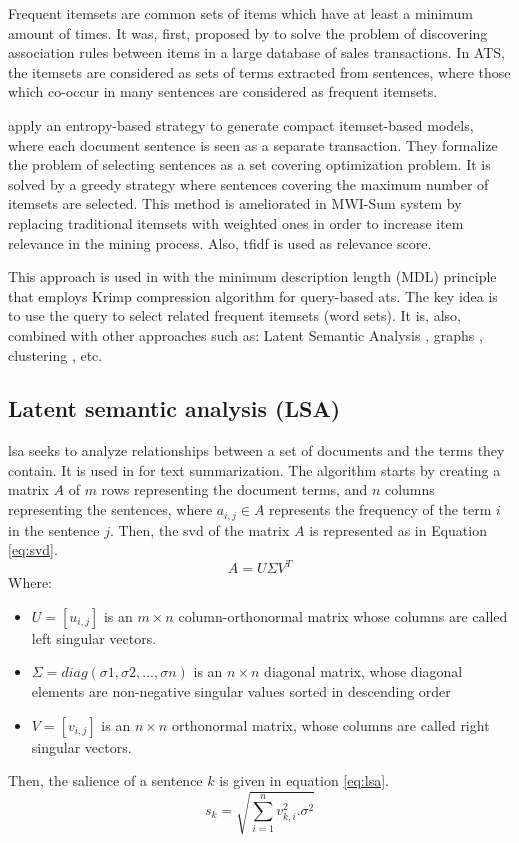 Frequent itemsets are common sets of items which have at least a minimum amount of times. 
It was, first, proposed by \citet{94-agrawal-srikant} to solve the problem of discovering association rules
between items in a large database of sales transactions.
In ATS, the itemsets are considered as sets of terms extracted from sentences, where those which co-occur in many sentences are considered as frequent itemsets.

\citet{12-baralis-al} apply an entropy-based strategy to generate compact itemset-based models, where each document sentence is seen as a separate transaction. 
They formalize the problem of selecting sentences as a set covering optimization problem.
It is solved by a greedy strategy where sentences covering the maximum number of itemsets are selected.
This method is ameliorated in MWI-Sum system \citep{15-baralis-al} by replacing traditional itemsets with weighted ones in order to increase item relevance in the mining process. 
Also, \ac{tfidf} is used as relevance score. 

This approach is used in \citep{17-litvak-vanetik} with the minimum description length (MDL) principle that employs
Krimp compression algorithm \citep{11-vreeken-al} for query-based \ac{ats}.
The key idea is to use the query to select related frequent itemsets (word sets).
It is, also, combined with other approaches such as: Latent Semantic Analysis \citep{19-cagliero-al}, graphs \citep{18-azadani-al}, clustering \citep{19-rouane-al}, etc.

\subsection{Latent semantic analysis (LSA)}

\ac{lsa} seeks to analyze relationships between a set of documents and the terms they contain.
It is used in \citep{04-steinberger-jezek} for text summarization. 
The algorithm starts by creating a matrix $ A $ of $ m $ rows representing the document terms, and $ n $ columns representing the sentences, where $ a_{i, j} \in A $ represents the frequency of the term $ i $ in the sentence $ j $. 
Then, the \ac{svd} of the matrix $ A $ is represented as in Equation \ref{eq:svd}.
\begin{equation}
	\label{eq:svd}
	A = U \varSigma V^T
\end{equation}
Where:
\begin{itemize}
	\item $ U = [u_{i,j}] $ is an $ m \times n $ column-orthonormal matrix whose columns are called left singular vectors.
	\item $ \varSigma = diag(\sigma 1, \sigma 2, ..., \sigma n) $ is an $ n \times n $ diagonal matrix, whose diagonal elements are non-negative singular values sorted in descending order
	\item $ V = [v_{i,j}] $ is an $ n \times n $ orthonormal matrix, whose columns are called right singular vectors.  
\end{itemize}
Then, the salience of a sentence $ k $ is given in equation \ref{eq:lsa}.
\begin{equation}
	\label{eq:lsa}
	s_k = \sqrt{\sum\limits_{i=1}^{n} v_{k,i}^2 . \sigma^2}
\end{equation}

